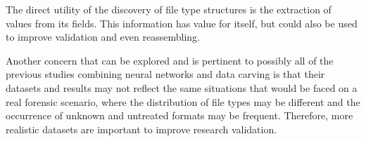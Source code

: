 The direct utility of the discovery of file type structures is the extraction of values from its fields. This information has value for itself, but could also be used to improve validation and even reassembling.

Another concern that can be explored and is pertinent to possibly all of the previous studies combining neural networks and data carving is that their datasets and results may not reflect the same situations that would be faced on a real forensic scenario, where the distribution of file types may be different and the occurrence of unknown and untreated formats may be frequent. Therefore, more realistic datasets are important to improve research validation. 

